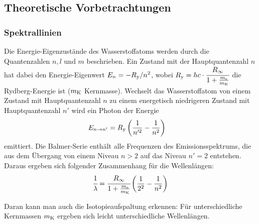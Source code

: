 \subsection{Theoretische Vorbetrachtungen}
\subsubsection{Spektrallinien}
Die Energie-Eigenzustände des Wasserstoffatoms werden durch die Quantenzahlen $n,l$ und $m$ beschrieben. Ein Zustand mit der Hauptquantenzahl $n$ hat dabei den Energie-Eigenwert $E_n=-R_\mathrm{y}/n^2$, wobei $R_\mathrm{y} = hc\cdot \cfrac{R_\infty}{1+\frac{m_\mathrm{e}}{m_\mathrm{K}}}$ die Rydberg-Energie ist ($m_\mathrm{K}$ Kernmasse). Wechselt das Wasserstoffatom von einem Zustand mit Hauptquantenzahl $n$ zu einem energetisch niedrigeren Zustand mit Hauptquantenzahl $n'$ wird ein Photon der Energie 
\begin{align*}
  E_{n \rightarrow n'}&=R_\mathrm{y} \left( \frac{1}{n'^2} - \frac{1}{n^2}\right)
\end{align*}
emittiert. Die Balmer-Serie enthält alle Frequenzen des Emissionsspektrums, die aus dem Übergang von einem Niveau $n>2$ auf das Niveau $n'=2$ entstehen. Daraus ergeben sich folgender Zusammenhang für die Wellenlängen:
\begin{align}
  \cfrac{1}{\lambda} = \cfrac{R_\infty}{1+\frac{m_\mathrm{e}}{m_\mathrm{K}}} \left( \frac{1}{2^2} - \frac{1}{n^2}\right)
  \label{equ:rydberg}
\end{align}

Daran kann man auch die Isotopieaufspaltung erkennen: Für unterschiedliche Kernmassen $m_\mathrm{K}$ ergeben sich leicht unterschiedliche Wellenlängen. 

